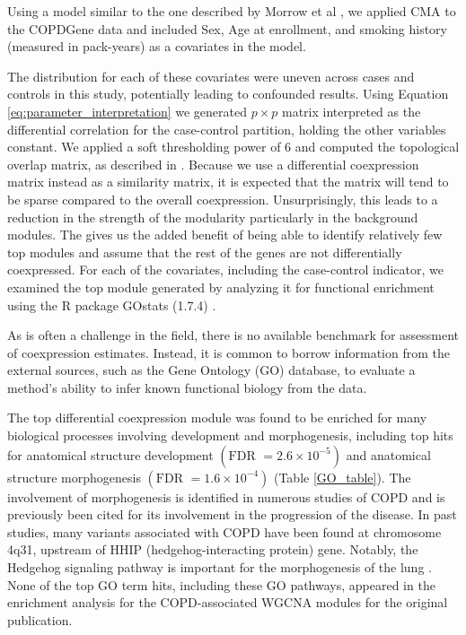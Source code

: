Using a model similar to the one described by Morrow et al \cite{morrow2017functional}, we applied CMA to the COPDGene data and included Sex, Age at enrollment, and smoking history (measured in pack-years) as a covariates in the model.

The distribution for each of these covariates were uneven across cases and controls in this study,
potentially leading to confounded results. Using Equation \ref{eq:parameter_interpretation}
we generated $p\times p$ matrix interpreted as the differential correlation
for the case-control partition, holding the other variables constant. We applied a
soft thresholding power of 6 and computed the topological overlap
matrix, as described in \cite{wgcna1}. Because we use a differential coexpression matrix instead as a similarity matrix, it is expected that the matrix will tend to be sparse compared to the overall coexpression.  Unsurprisingly, this leads to a reduction in the strength of the modularity particularly in the background modules. The gives us the added benefit of being able to identify relatively few top modules and assume that the rest of the genes are not differentially coexpressed. For each of the covariates, including the case-control indicator, we examined the top module generated by analyzing it for functional enrichment using the R package GOstats (1.7.4) \cite{falcon2007using}. 

As is often a challenge in the field, there is no available benchmark for assessment of coexpression estimates. Instead, it is common to borrow information from the external sources, such as the Gene Ontology (GO) database, to evaluate a method's ability to infer known functional biology from the data.

The top differential coexpression module was found
to be enriched for many biological processes involving development and morphogenesis, including top hits for anatomical structure development $\left(\text{FDR }=2.6\times10^{-5}\right)$ and anatomical structure morphogenesis $\left(\text{FDR }=1.6\times10^{-4}\right)$ (Table \ref{GO_table}).  The involvement of morphogenesis is identified in numerous studies of COPD and is previously been cited for its involvement in the progression of the disease\cite{morrisey2013molecular,shi2009mechanisms}.  In past studies, many variants associated with COPD have been found at chromosome 4q31, upstream of HHIP (hedgehog-interacting protein) gene\cite{zhou2012identification}.  Notably, the Hedgehog signaling pathway is important for the morphogenesis of the lung \cite{chuang2003feedback}. None of the top GO term hits, including these GO pathways, appeared in the enrichment analysis for the COPD-associated WGCNA modules for the original publication.

